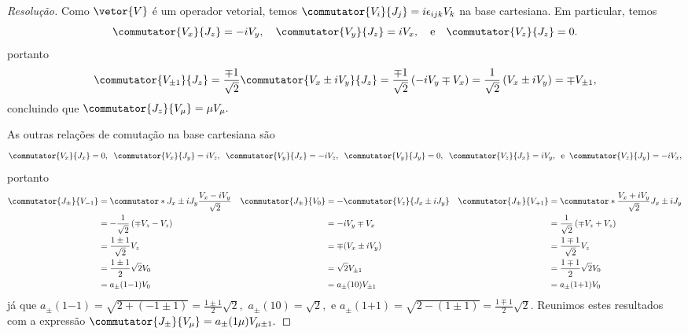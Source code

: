 \begin{proof}[Resolução]
    Como \(\vetor{V}\) é um operador vetorial, temos \(\commutator{V_i}{J_j} = i \epsilon_{ijk} V_k\) na base cartesiana. Em particular, temos
    \begin{equation*}
        \commutator{V_x}{J_z} = -i V_y,\quad
        \commutator{V_y}{J_z} = i V_x,\quad\text{e}\quad
        \commutator{V_z}{J_z} = 0.
    \end{equation*}
    portanto
    \begin{equation*}
        \commutator{V_{\pm1}}{J_z} = \frac{\mp 1}{\sqrt{2}} \commutator{V_x \pm i V_y}{J_z} = \frac{\mp 1}{\sqrt{2}} \left(-iV_y \mp V_x\right) = \frac{1}{\sqrt{2}} \left(V_x \pm i V_y\right) = \mp V_{\pm 1},
    \end{equation*}
    concluindo que \(\commutator{J_z}{V_\mu} = \mu V_\mu.\) 

    As outras relações de comutação na base cartesiana são
    \begin{equation*}
        \commutator{V_x}{J_x} = 0,\;\;
        \commutator{V_x}{J_y} = i V_z,\;\;
        \commutator{V_y}{J_x} = -i V_z,\;\;
        \commutator{V_y}{J_y} = 0,\;\;
        \commutator{V_z}{J_x} = i V_y,\;\;\text{e}\;\;
        \commutator{V_z}{J_y} = -i V_x,
    \end{equation*}
    portanto
    \begin{align*}
        \commutator{J_{\pm}}{V_{-1}} &= \commutator*{J_x \pm i J_y}{\frac{V_x - i V_y}{\sqrt{2}}}&
        \commutator{J_{\pm}}{V_0} &= -\commutator{V_z}{J_x \pm i J_y}&
        \commutator{J_{\pm}}{V_{+1}} &= \commutator*{\frac{V_x + i V_y}{\sqrt{2}}}{J_x \pm i J_y}\\
                                     &= -\frac{1}{\sqrt{2}} \left(\mp V_z - V_z\right)&
                                     &= - i V_y \mp V_x&
                                     &= \frac{1}{\sqrt{2}} \left(\mp V_z + V_z\right)\\
                                     &= \frac{1 \pm 1}{\sqrt{2}} V_z&
                                     &= \mp (V_x \pm i V_y)&
                                     &= \frac{1 \mp 1}{\sqrt{2}} V_z\\
                                     &= \frac{1 \pm 1}{2} \sqrt{2} V_0&
                                     &= \sqrt{2} V_{\pm1}&
                                     &= \frac{1 \mp 1}{2} \sqrt{2} V_0\\
                                     &= a_{\pm}(1{-1}) V_{0}&
                                     &= a_{\pm}(10) V_{\pm 1}&
                                     &= a_{\pm}(1{+1}) V_{0}
    \end{align*}
    já que \(a_{\pm}(1{-1}) = \sqrt{2 + (-1\pm 1)} = \frac{1 \pm 1}{2}\sqrt{2},\) \(a_{\pm}(10) = \sqrt{2},\) e \(a_{\pm}(1{+1}) = \sqrt{2 - (1 \pm 1)} = \frac{1\mp1}{2}\sqrt{2}\). Reunimos estes resultados com a expressão \(\commutator{J_{\pm}}{V_\mu} = a_{\pm}(1\mu) V_{\mu \pm 1}.\)


\end{proof}
